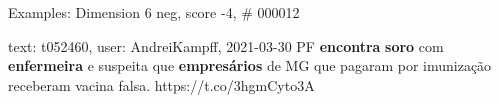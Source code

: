 \begin{frame}{Examples: Dimension 6 neg, score -4, \# 000012}
\footnotesize
\begin{alertblock}{text: t052460, user: AndreiKampff, 2021-03-30}
PF \textbf{encontra} \textbf{soro} com \textbf{enfermeira} e suspeita que 
\textbf{empresários} de MG que pagaram por imunização receberam vacina falsa. 
https://t.co/3hgmCyto3A 
\end{alertblock}
\end{frame}
